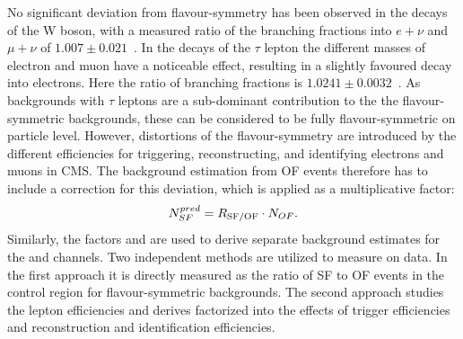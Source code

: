 No significant deviation from flavour-symmetry has been observed in the decays of the W boson, with a measured ratio of the branching fractions into $e+\nu$ and $\mu + \nu$ of $1.007\pm0.021$~\cite{PDG}. In the decays of the $\tau$ lepton the different masses of electron and muon have a noticeable effect, resulting in a slightly favoured decay into electrons. Here the ratio of branching fractions is $1.0241\pm0.0032$~\cite{PDG}. As backgrounds with $\tau$ leptons are a sub-dominant contribution to the the flavour-symmetric backgrounds, these can be considered to be fully flavour-symmetric on particle level. However, distortions of the flavour-symmetry are introduced by the different efficiencies for triggering, reconstructing, and identifying electrons and muons in CMS. The background estimation from OF events therefore has to include a correction for this deviation, which is applied as a multiplicative factor:
\begin{equation}
N_{SF}^{pred} = R_{\text{SF/OF}} \cdot N_{OF}.
\end{equation}
Similarly, the factors \Reeof and \Rmmof are used to derive separate background estimates for the \EE and \MM channels. Two independent methods are utilized to measure \Rsfof on data. In the first approach it is directly measured as the ratio of SF to OF events in the control region for flavour-symmetric backgrounds. The second approach studies the lepton efficiencies and derives \Rsfof factorized into the effects of trigger efficiencies and reconstruction and identification efficiencies.  

